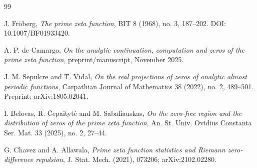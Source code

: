 \documentclass[11pt]{article}
\theoremstyle{definition}
\begin{document}
\begin{thebibliography}{99}

J. Fr\"oberg,
\emph{The prime zeta function},
BIT 8 (1968), no. 3, 187--202.
DOI: 10.1007/BF01933420.

A. P. de Camargo,
\emph{On the analytic continuation, computation and zeros of the prime zeta function},
preprint/manuscript, November 2025.

J. M. Sepulcre and T. Vidal,
\emph{On the real projections of zeros of analytic almost periodic functions},
Carpathian Journal of Mathematics 38 (2022), no. 2, 489--501.
Preprint: arXiv:1805.02041.

I. Belovas, R. \v{C}epaityt\.e and M. Sabaliauskas,
\emph{On the zero-free region and the distribution of zeros of the prime zeta function},
An. St. Univ. Ovidius Constanta Ser. Mat. 33 (2025), no. 2, 27--44.

G. Chavez and A. Allawala,
\emph{Prime zeta function statistics and Riemann zero-difference repulsion},
J. Stat. Mech. (2021), 073206; arXiv:2102.02280.


\end{thebibliography}
\end{document}
